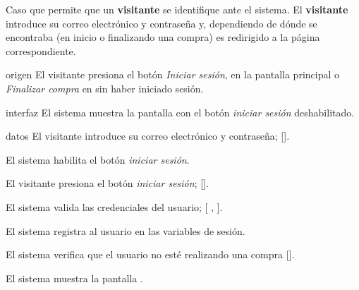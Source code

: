 %
%

{
  Caso que permite que un \textbf{visitante} se identifique ante el sistema. El
  \textbf{visitante} introduce su correo electrónico y contraseña y,
  dependiendo de dónde se encontraba (en inicio o finalizando una compra) es
  redirigido a la página correspondiente.

  \begin{trayectoriaPrincipal}

    \item[origen] El visitante presiona el botón \textit{Iniciar sesión}, en
      la pantalla principal  o
      \textit{Finalizar compra} en  sin
      haber iniciado sesión.

    \item[interfaz] El sistema muestra la pantalla
       con el botón \textit{iniciar sesión}
      deshabilitado.

    \item[datos] El visitante introduce su correo electrónico y contraseña;
      [].

    \item El sistema habilita el botón \textit{iniciar sesión}.

    \item El visitante presiona el botón \textit{iniciar sesión};
      [].

    \item El sistema valida las credenciales del usuario; [%
      ,
      ].

    \item El sistema registra al usuario en las variables de sesión.

    \item El sistema verifica que el usuario no esté realizando una compra
      [].

    \item El sistema muestra la pantalla .

  \end{trayectoriaPrincipal}


}
